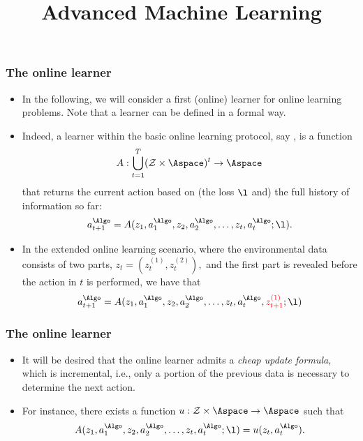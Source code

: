 \documentclass[11pt,compress,t,notes=noshow, xcolor=table]{beamer}
\title{Advanced Machine Learning}
\date{}
\begin{document}



\sloppy


\begin{frame}
	\frametitle{The online learner}
	\small
	\begin{itemize}
		\item In the following, we will consider a first (online) learner for   online learning problems. Note that a learner can be defined in a formal way.
		\pause
%		
		\item Indeed, a learner within the basic online learning protocol, say \Algo, is a function $$A: \bigcup_{t=1}^T (\Zspace \times \Aspace)^t \to \Aspace$$ that returns the current action based on (the loss $\l$ and) the full history of information so far:
		$$	a_{t+1}^{\Algo} = A(z_1,a_1^{\Algo},z_2,a_2^{\Algo},\ldots,z_t,a_t^{\Algo};\l).		$$
		\pause
		\item In the extended online learning scenario, where the environmental data consists of two parts, $z_t=(z_t^{(1)},z_t^{(2)}   ),$ and the {\color{red}first part is revealed before the action in $t$ is performed}, we have that
		$$	a_{t+1}^{\Algo} =  A(z_1,a_1^{\Algo},z_2,a_2^{\Algo},\ldots,z_t,a_t^{\Algo},{\color{red} z_{t+1}^{(1)}};\l)  		$$

%		
				 
	\end{itemize}
\end{frame}


\begin{frame}
	\frametitle{The online learner}
	\small
	\begin{itemize}
 		\item It will be desired that the online learner admits a \emph{cheap update formula}, which is incremental, i.e., only a portion of the previous data is necessary to determine the next action.
		\item  For instance, there exists a function $u:\Zspace \times \Aspace \to \Aspace$ such that 
		$$	A(z_1,a_1^{\Algo},z_2,a_2^{\Algo},\ldots,z_t,a_t^{\Algo};\l) = u(z_t,a_t^{\Algo}).$$
		
	\end{itemize}
\end{frame}
\end{document}
